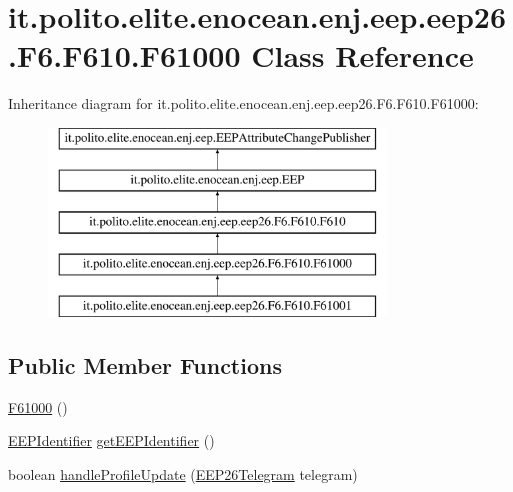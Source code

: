 \hypertarget{classit_1_1polito_1_1elite_1_1enocean_1_1enj_1_1eep_1_1eep26_1_1_f6_1_1_f610_1_1_f61000}{}\section{it.\+polito.\+elite.\+enocean.\+enj.\+eep.\+eep26.\+F6.\+F610.\+F61000 Class Reference}
\label{classit_1_1polito_1_1elite_1_1enocean_1_1enj_1_1eep_1_1eep26_1_1_f6_1_1_f610_1_1_f61000}
Inheritance diagram for it.\+polito.\+elite.\+enocean.\+enj.\+eep.\+eep26.\+F6.\+F610.\+F61000\+:\begin{figure}[H]
\begin{center}
\leavevmode
\includegraphics[height=5.000000cm]{classit_1_1polito_1_1elite_1_1enocean_1_1enj_1_1eep_1_1eep26_1_1_f6_1_1_f610_1_1_f61000}
\end{center}
\end{figure}
\subsection*{Public Member Functions}
\begin{DoxyCompactItemize}
\item 
\hyperlink{classit_1_1polito_1_1elite_1_1enocean_1_1enj_1_1eep_1_1eep26_1_1_f6_1_1_f610_1_1_f61000_a72084a4e522dcb431237079669f9ab6e}{F61000} ()
\item 
\hyperlink{classit_1_1polito_1_1elite_1_1enocean_1_1enj_1_1eep_1_1_e_e_p_identifier}{E\+E\+P\+Identifier} \hyperlink{classit_1_1polito_1_1elite_1_1enocean_1_1enj_1_1eep_1_1eep26_1_1_f6_1_1_f610_1_1_f61000_a9f9edc43aaab47e64c96c48530696805}{get\+E\+E\+P\+Identifier} ()
\item 
boolean \hyperlink{classit_1_1polito_1_1elite_1_1enocean_1_1enj_1_1eep_1_1eep26_1_1_f6_1_1_f610_1_1_f61000_a27ab57856a01ce9a1fbb46ed6e44f3c1}{handle\+Profile\+Update} (\hyperlink{classit_1_1polito_1_1elite_1_1enocean_1_1enj_1_1eep_1_1eep26_1_1telegram_1_1_e_e_p26_telegram}{E\+E\+P26\+Telegram} telegram)
\end{DoxyCompactItemize}
